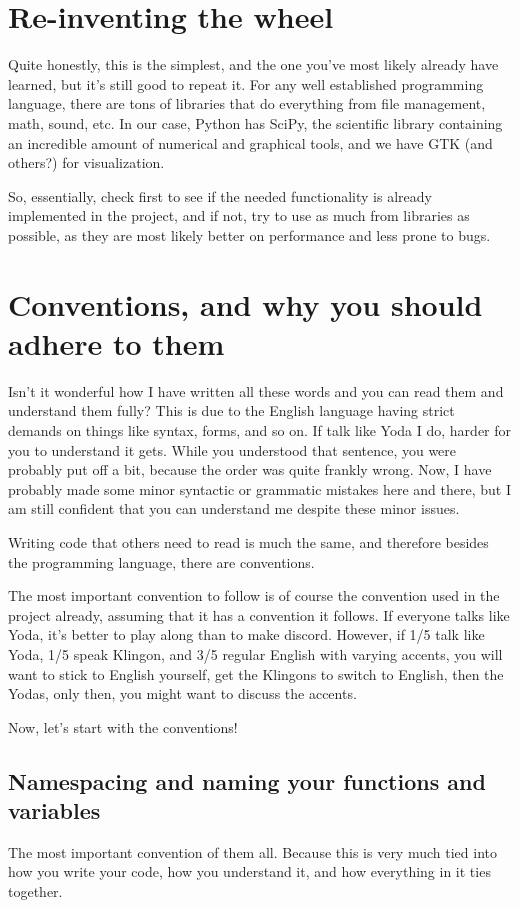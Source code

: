\documentclass[10pt,a4paper]{article}
\begin{document}
\section{Re-inventing the wheel}
Quite honestly, this is the simplest, and the one you've most likely already have learned, but it's still good to repeat it. For any well established programming language, there are tons of libraries that do everything from file management, math, sound, etc. In our case, Python has SciPy, the scientific library containing an incredible amount of numerical and graphical tools, and we have GTK (and others?) for visualization. %

So, essentially, check first to see if the needed functionality is already implemented in the project, and if not, try to use as much from libraries as possible, as they are most likely better on performance and less prone to bugs.

\section{Conventions, and why you should adhere to them}
Isn't it wonderful how I have written all these words and you can read them and understand them fully? This is due to the English language having strict demands on things like syntax, forms, and so on. If talk like Yoda I do, harder for you to understand it gets. While you understood that sentence, you were probably put off a bit, because the order was quite frankly wrong. Now, I have probably made some minor syntactic or grammatic mistakes here and there, but I am still confident that you can understand me despite these minor issues. 

Writing code that others need to read is much the same, and therefore besides the programming language, there are conventions. 

The most important convention to follow is of course the convention used in the project already, assuming that it has a convention it follows. If everyone talks like Yoda, it's better to play along than to make discord. However, if 1/5 talk like Yoda, 1/5 speak Klingon, and 3/5 regular English with varying accents, you will want to stick to English yourself, get the Klingons to switch to English, then the Yodas, only then, you might want to discuss the accents.

Now, let's start with the conventions!
\subsection{Namespacing and naming your functions and variables}
The most important convention of them all. Because this is very much tied into how you write your code, how you understand it, and how everything in it ties together.
\end{document}
